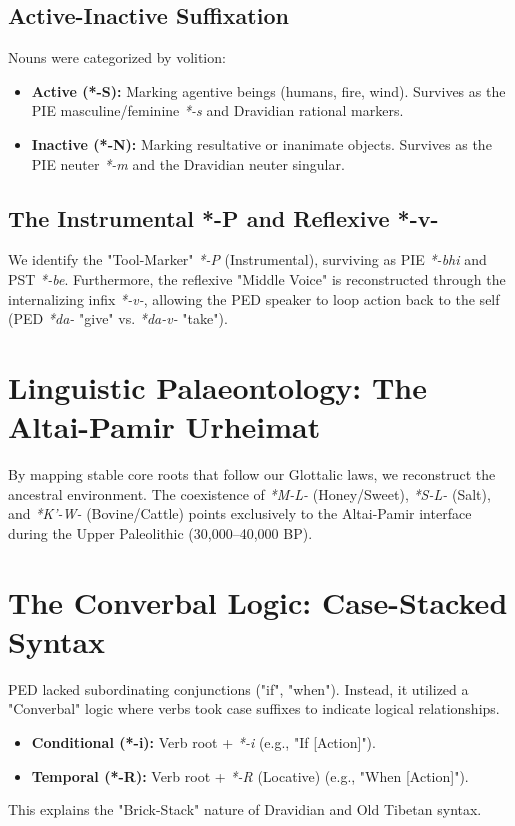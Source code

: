 \documentclass[11pt,a4paper]{article}
\begin{document}
\subsection{Active-Inactive Suffixation}
Nouns were categorized by volition:
\begin{itemize}
    \item \textbf{Active (*-S):} Marking agentive beings (humans, fire, wind). Survives as the PIE masculine/feminine \textit{*-s} and Dravidian rational markers.
    \item \textbf{Inactive (*-N):} Marking resultative or inanimate objects. Survives as the PIE neuter \textit{*-m} and the Dravidian neuter singular.
\end{itemize}

\subsection{The Instrumental *-P and Reflexive *-v-}
We identify the "Tool-Marker" \textit{*-P} (Instrumental), surviving as PIE \textit{*-bhi} and PST \textit{*-be}. Furthermore, the reflexive "Middle Voice" is reconstructed through the internalizing infix \textit{*-v-}, allowing the PED speaker to loop action back to the self (PED \textit{*da-} "give" vs. \textit{*da-v-} "take").

\section{Linguistic Palaeontology: The Altai-Pamir Urheimat}
By mapping stable core roots that follow our Glottalic laws, we reconstruct the ancestral environment. The coexistence of \textit{*M-L-} (Honey/Sweet), \textit{*S-L-} (Salt), and \textit{*K'-W-} (Bovine/Cattle) points exclusively to the Altai-Pamir interface during the Upper Paleolithic (30,000--40,000 BP).

\section{The Converbal Logic: Case-Stacked Syntax}
PED lacked subordinating conjunctions ("if", "when"). Instead, it utilized a "Converbal" logic where verbs took case suffixes to indicate logical relationships.
\begin{itemize}
    \item \textbf{Conditional (*-i):} Verb root + \textit{*-i} (e.g., "If [Action]").
    \item \textbf{Temporal (*-R):} Verb root + \textit{*-R} (Locative) (e.g., "When [Action]").
\end{itemize}
This explains the "Brick-Stack" nature of Dravidian and Old Tibetan syntax.
\end{document}
